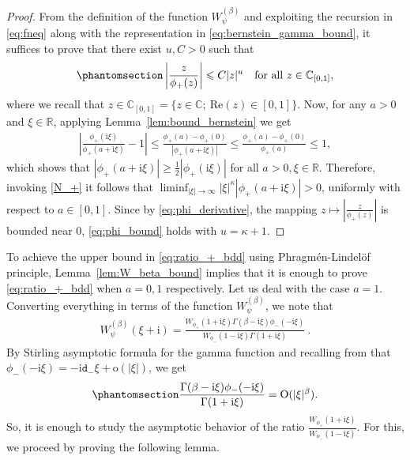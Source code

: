 \documentclass[12pt]{amsart}
\newcommand{\hlabel}{\phantomsection\label}
\numberwithin{equation}{section}
\newcommand{\bb}{\mathbb}
\renewcommand{\ge}{\geqslant}
\renewcommand{\le}{\leqslant}
\renewcommand{\Re}{\textrm{Re}}
\newcommand{\ttt}{\mathtt}
\renewcommand{\i}{\mathrm{i}}
\theoremstyle{definition}
\theoremstyle{assump}
\theoremstyle{remark}
\begin{document}
{{\begin{proof}
	From the definition of the function $W^{(\beta)}_\psi$ and exploiting the recursion in \eqref{eq:fneq} along with the representation in \eqref{eq:bernstein_gamma_bound}, it suffices to prove that there exist $u,C>0$ such that
	\begin{align}\hlabel{eq:phi_bound}
		\left|\frac{z}{\phi_+(z)}\right|\le  C|z|^{u} \quad \text{for all $z\in \bb{C}_{[0,1]}$},
	\end{align}
	where we recall that $z\in\bb{C}_{[0,1]}=\{z\in\bb{C};\ \Re(z)\in [0,1]\}$. Now, for any $a>0$ and $\xi\in\bb R$, applying Lemma~\ref{lem:bound_bernstein} we get
	\begin{align*}
		\left|\frac{\phi_+(\i\xi)}{\phi_+(a+\i\xi)}-1\right|\le \frac{\phi_+(a)-\phi_+(0)}{|\phi_+(a+\i\xi)|}\le\frac{\phi_+(a)-\phi_+(0)}{\phi_+(a)}\le 1,
	\end{align*}
which shows that $|\phi_+(a+\i\xi)|\ge\frac{1}{2}|\phi_+(\i\xi)|$ for all $a>0, \xi\in\bb R$. Therefore, invoking \eqref{N_+} it follows that $\liminf_{|\xi|\to\infty} |\xi|^\kappa|\phi_+(a+\i\xi)|>0$, uniformly with respect to $a\in [0,1]$. Since by \eqref{eq:phi_derivative}, the mapping  $z\mapsto |\frac{z}{\phi_+(z)}|$ is bounded near $0$, \eqref{eq:phi_bound} holds with $u=\kappa+1$.
\end{proof}
}
To achieve the upper bound in \eqref{eq:ratio_+_bdd} using Phragm\'en-Lindel\"of principle, Lemma~\ref{lem:W_beta_bound} implies that it is enough to prove \eqref{eq:ratio_+_bdd} when $a=0,1$ respectively. Let us deal with the case $a=1$. Converting everything in terms of the function $W^{(\beta)}_\psi$, we note that
\begin{align*}
	W^{(\beta)}_\psi(\xi+\i)=\frac{W_{\phi_+}(1+\mathrm{i}\xi)\Gamma(\beta-\mathrm{i}\xi)\phi_-(-\mathrm{i}\xi)}{W_{\phi_-}(1-\mathrm{i}\xi)\Gamma(1+\mathrm{i}\xi)}~.
\end{align*}
By Stirling asymptotic formula for the gamma function and recalling from \cite[Proposition~3.1(4)]{patie2018} that $\phi_-(-\i\xi)=-\i\ttt{d}_-\xi+\mathrm{o}(|\xi|)$,
we get
\begin{align}\hlabel{eq:gamma_phi_ratio}
\frac{\Gamma(\beta-\mathrm{i}\xi)\phi_-(-\mathrm{i}\xi)}{\Gamma(1+\mathrm{i}\xi)}=\mathrm{O}(|\xi|^\beta).
\end{align}
So, it is enough to study the asymptotic behavior of the ratio $\frac{W_{\phi_+}(1+\mathrm{i}\xi)}{W_{\phi_-}(1-\mathrm{i}\xi)}$. For this, we proceed by proving the following lemma.

}
\end{document}
